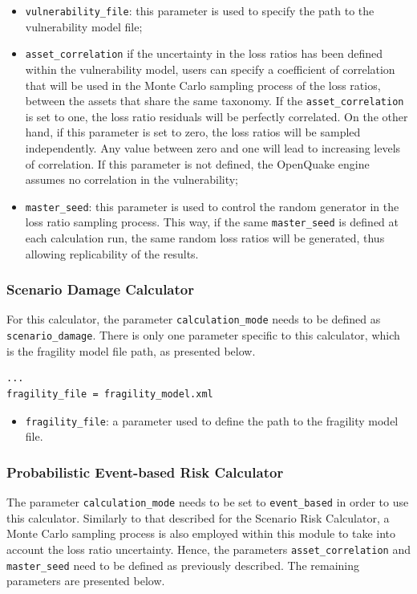 \begin{itemize}
\item  \Verb+vulnerability_file+: this parameter is used to specify the path to the \gls{vulnerability model} file;
\item \texttt{asset\_cor\-re\-la\-tion} if the uncertainty in the loss ratios has been defined within the \gls{vulnerability model}, users can specify a coefficient of correlation that will be used in the Monte Carlo sampling process of the loss ratios, between the assets that share the same \gls{taxonomy}. If the \texttt{asset\_cor\-re\-la\-tion} is set to one, the loss ratio residuals will be perfectly correlated. On the other hand, if this parameter is set to zero, the loss ratios will be sampled independently. Any value between zero and one will lead to increasing levels of correlation. If this parameter is not defined, the OpenQuake engine assumes no correlation in the vulnerability;
\item  \Verb+master_seed+: this parameter is used to control the random generator in the loss ratio sampling process. This way, if the same \Verb+master_seed+ is defined at each calculation run, the same random loss ratios will be generated, thus allowing replicability of the results.
\end{itemize}

\subsubsection{Scenario Damage Calculator}
For this calculator, the parameter \Verb+calculation_mode+ needs to be defined as \Verb+scenario_damage+. There is only one parameter specific to this calculator, which is the \gls{fragility model} file path, as presented below.

\begin{Verbatim}[frame=single, commandchars=\\\{\}, samepage=true]
...
fragility_file = fragility_model.xml
\end{Verbatim}

\begin{itemize}
\item  \Verb+fragility_file+: a parameter used to define the path to the \gls{fragility model} file.
\end{itemize}

\subsubsection{Probabilistic Event-based Risk Calculator}
The parameter \Verb+calculation_mode+ needs to be set to \Verb+event_based+ in order to use this calculator. Similarly to that described for the Scenario Risk Calculator, a Monte Carlo sampling process is also employed within this module to take into account the loss ratio uncertainty. Hence, the parameters \Verb+asset_correlation+ and \Verb+master_seed+ need to be defined as previously described. The remaining parameters are presented below.

